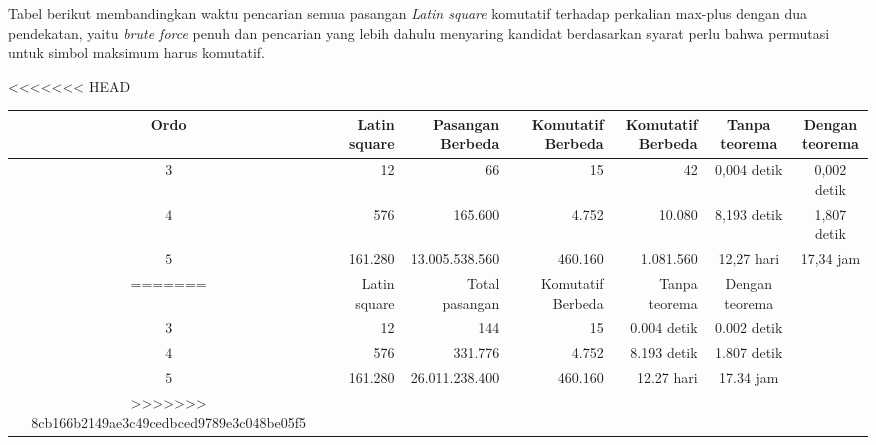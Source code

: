 
\noindent
Tabel berikut membandingkan waktu pencarian semua pasangan \textit{Latin square}
komutatif terhadap perkalian max-plus dengan dua pendekatan, yaitu
\textit{brute force} penuh dan pencarian yang lebih dahulu menyaring kandidat
berdasarkan syarat perlu bahwa permutasi untuk simbol maksimum harus
komutatif.

\begin{center}
    \small
    \renewcommand{\arraystretch}{1.2}
<<<<<<< HEAD
    \begin{tabular}{|c|r|r|r|r|c|c|}
        \hline
        Ordo &
        \makecell{Latin\\square} &
        \makecell{Pasangan\\Berbeda} &
        \makecell{Komutatif\\Berbeda} &
        \makecell{Komutatif\\Berbeda} &
        \makecell{Tanpa\\teorema} &
        \makecell{Dengan\\teorema} \\
        \hline
        $3$  & 12           & 66             & 15          &42& 0,004 detik & 0,002 detik \\
        \hline
        $4$  & 576          & 165.600        & 4.752   &10.080    & 8,193 detik & 1,807 detik \\
        \hline
        $5$  & 161.280      & 13.005.538.560 & 460.160 &1.081.560    & 12,27 hari  & 17,34 jam \\
=======
    \begin{tabular}{|c|r|r|r|c|c|}
        \hline
        Ordo & Latin square & Total pasangan & Komutatif Berbeda & Tanpa teorema & Dengan teorema \\
        \hline
        $3$  & 12           & 144            & 15               & 0.004 detik   & 0.002 detik    \\
        \hline
        $4$  & 576          & 331.776        & 4.752           & 8.193 detik   & 1.807 detik    \\
        \hline
        $5$  & 161.280      & 26.011.238.400 & 460.160    & 12.27 hari    & 17.34 jam      \\
>>>>>>> 8cb166b2149ae3c49cedbced9789e3c048be05f5
        \hline
    \end{tabular}
\end{center}


